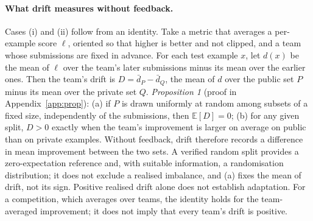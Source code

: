 \documentclass[10pt]{article}
\begin{document}
\paragraph{What drift measures without feedback.} Cases (i) and (ii) follow from an identity. Take a metric that averages a per-example score $\ell$, oriented so that higher is better and not clipped, and a team whose submissions are fixed in advance. For each test example $x$, let $d(x)$ be the mean of $\ell$ over the team's later submissions minus its mean over the earlier ones. Then the team's drift is $D=\bar d_P-\bar d_Q$, the mean of $d$ over the public set $P$ minus its mean over the private set $Q$. \emph{Proposition 1} (proof in Appendix~\ref{app:prop}): (a) if $P$ is drawn uniformly at random among subsets of a fixed size, independently of the submissions, then $\mathbb{E}[D]=0$; (b) for any given split, $D>0$ exactly when the team's improvement is larger on average on public than on private examples. Without feedback, drift therefore records a difference in mean improvement between the two sets. A verified random split provides a zero-expectation reference and, with suitable information, a randomisation distribution; it does not exclude a realised imbalance, and (a) fixes the mean of drift, not its sign. Positive realised drift alone does not establish adaptation. For a competition, which averages over teams, the identity holds for the team-averaged improvement; it does not imply that every team's drift is positive.
\end{document}
